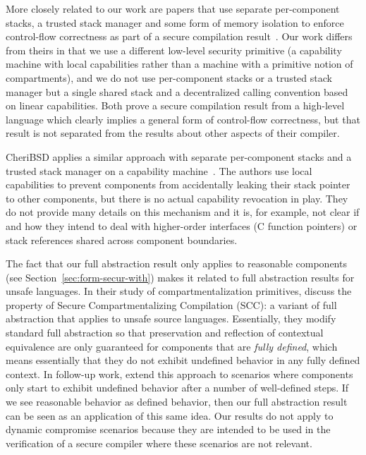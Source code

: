 \documentclass[acmsmall,screen]{acmart}\settopmatter{}
\begin{document}
More closely related to our work are papers that use separate per-component stacks, a trusted stack manager and some form of memory isolation to enforce control-flow correctness as part of a secure compilation result~\citep{patrignani_modular_2016,juglaret_beyond_2016}.
Our work differs from theirs in that we use a different low-level security primitive (a capability machine with local capabilities rather than a machine with a primitive notion of compartments), and we do not use per-component stacks or a trusted stack manager but a single shared stack and a decentralized calling convention based on linear capabilities.
Both prove a secure compilation result from a high-level language which clearly implies a general form of control-flow correctness, but that result is not separated from the results about other aspects of their compiler.

CheriBSD applies a similar approach with separate per-component stacks and a trusted stack manager on a capability machine~\cite{watson_cheri:_2015}.
The authors use local capabilities to prevent components from accidentally leaking their stack pointer to other components, but there is no actual capability revocation in play.
They do not provide many details on this mechanism and it is, for example, not clear if and how they intend to deal with higher-order interfaces (C function pointers) or stack references shared across component boundaries. 

The fact that our full abstraction result only applies to reasonable components (see Section~\ref{sec:form-secur-with}) makes it related to full abstraction results for unsafe languages.
In their study of compartmentalization primitives,  discuss the property of Secure Compartmentalizing Compilation (SCC): a variant of full abstraction that applies to unsafe source languages.
Essentially, they modify standard full abstraction so that preservation and reflection of contextual equivalence are only guaranteed for components that are {\itshape fully defined}, which means essentially that they do not exhibit undefined behavior in any fully defined context.
In follow-up work, \citet{Abate:2018:GCG:3243734.3243745} extend this approach to scenarios where components only start to exhibit undefined behavior after a number of well-defined steps. 
If we see reasonable behavior as defined behavior, then our full abstraction result can be seen as an application of this same idea.
Our results do not apply to dynamic compromise scenarios because they are intended to be used in the verification of a secure compiler where these scenarios are not relevant.
\end{document}

